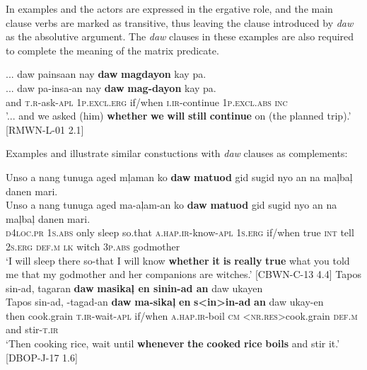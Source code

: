 In examples  and  the actors are expressed in the ergative role, and the main clause verbs are marked as transitive, thus leaving the clause introduced by \textit{daw} as the absolutive argument. The \textit{daw} clauses in these examples are also required to complete the meaning of the matrix predicate.

\ea
\label{bkm:Ref115094853}
... daw  painsaan  nay  \textbf{daw}  \textbf{magdayon}  kay  pa. \smallskip\\
\gll ... daw  pa-insa-an  nay  \textbf{daw}  \textbf{mag-dayon}  kay  pa. \\
{} and  \textsc{t.r}-ask-\textsc{apl}  1\textsc{p.excl.erg}  if/when  \textsc{i.ir}-continue  1\textsc{p.excl.abs}  \textsc{inc} \\
\glt '... and we asked (him) \textbf{whether} \textbf{we} \textbf{will} \textbf{still} \textbf{continue} on (the planned trip).’ [RMWN-L-01 2.1]
\z

Examples  and  illustrate similar constuctions with \textit{daw} clauses as complements:

\ea
\label{bkm:Ref115873391}
Unso  a  nang  tunuga  aged  mļaman  ko  \textbf{daw} \textbf{matuod}  gid  sugid  nyo  an  na  maļbaļ  danen  mari. \smallskip\\
\gll Unso  a  nang  tunuga  aged  ma-aļam-an  ko  \textbf{daw} \textbf{matuod}  gid  sugid  nyo  an  na  maļbaļ  danen  mari. \\
\textsc{d}4\textsc{loc.pr}  1\textsc{s.abs}  only  sleep  so.that  \textsc{a.hap.ir}-know-\textsc{apl}  1\textsc{s.erg}  if/when
true  \textsc{int}  tell  2\textsc{s.erg}  \textsc{def.m}  \textsc{lk}  witch  3\textsc{p.abs}  godmother \\
\glt `I will sleep there so-that I will know \textbf{whether} \textbf{it} \textbf{is} \textbf{really} \textbf{true} what you told me that my godmother and her companions are witches.’ [CBWN-C-13 4.4]
\z
\ea
\label{bkm:Ref115873572}
Tapos  sin-ad,  tagaran  \textbf{daw}  \textbf{masikaļ  en  sinin-ad  an} daw  ukayen \smallskip\\
\gll Tapos  sin-ad,  \emptyset{}-tagad-an  \textbf{daw}  \textbf{ma-sikaļ}  \textbf{en}  \textbf{s<in>in-ad}  \textbf{an} daw  ukay-en \\
then  cook.grain  \textsc{t.ir}-wait-\textsc{apl}  if/when  \textsc{a.hap.ir}-boil  \textsc{cm}  <\textsc{nr.res}>cook.grain  \textsc{def.m}
and  stir-\textsc{t.ir} \\
\glt `Then cooking rice, wait until \textbf{whenever} \textbf{the} \textbf{cooked} \textbf{rice} \textbf{boils} and stir it.’ [DBOP-J-17 1.6]
\z

